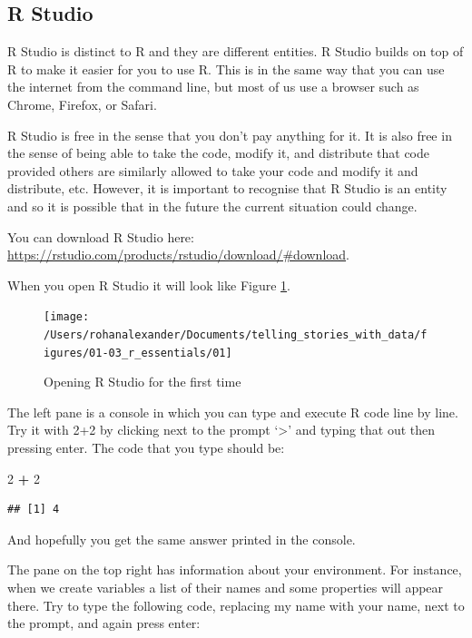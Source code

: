 \documentclass[
]{book}
\newenvironment{Shaded}{\begin{snugshade}}{\end{snugshade}}
\newcommand{\DecValTok}[1]{\textcolor[rgb]{0.00,0.00,0.81}{#1}}
\newcommand{\OperatorTok}[1]{\textcolor[rgb]{0.81,0.36,0.00}{\textbf{#1}}}
\newcommand{\StringTok}[1]{\textcolor[rgb]{0.31,0.60,0.02}{#1}}
\begin{document}
\hypertarget{r-studio}{%
\subsection{R Studio}\label{r-studio}}

R Studio is distinct to R and they are different entities. R Studio builds on top of R to make it easier for you to use R. This is in the same way that you can use the internet from the command line, but most of us use a browser such as Chrome, Firefox, or Safari.

R Studio is free in the sense that you don't pay anything for it. It is also free in the sense of being able to take the code, modify it, and distribute that code provided others are similarly allowed to take your code and modify it and distribute, etc. However, it is important to recognise that R Studio is an entity and so it is possible that in the future the current situation could change.

You can download R Studio here: \url{https://rstudio.com/products/rstudio/download/\#download}.

When you open R Studio it will look like Figure \ref{fig:first}.

\begin{figure}
\texttt{[image: /Users/rohanalexander/Documents/telling\_stories\_with\_data/figures/01-03\_r\_essentials/01]} \caption{Opening R Studio for the first time}\label{fig:first}
\end{figure}

The left pane is a console in which you can type and execute R code line by line. Try it with 2+2 by clicking next to the prompt `\textgreater{}' and typing that out then pressing enter. The code that you type should be:

\begin{Shaded}
\begin{Highlighting}[]
\DecValTok{2} \OperatorTok{+}\StringTok{ }\DecValTok{2}
\end{Highlighting}
\end{Shaded}

\begin{verbatim}
## [1] 4
\end{verbatim}

And hopefully you get the same answer printed in the console.

The pane on the top right has information about your environment. For instance, when we create variables a list of their names and some properties will appear there. Try to type the following code, replacing my name with your name, next to the prompt, and again press enter:
\end{document}
